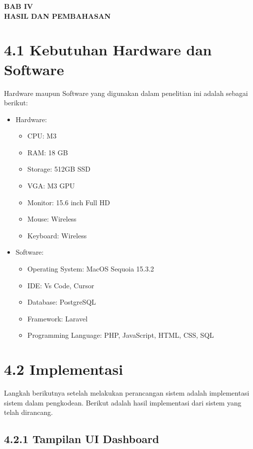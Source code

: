 \begin{center}
  \textbf{BAB IV} \\[0.5em]
  \textbf{HASIL DAN PEMBAHASAN}
\end{center}

\section*{4.1 Kebutuhan Hardware dan Software}
Hardware maupun Software yang digunakan dalam penelitian ini adalah sebagai berikut:

\begin{itemize}
  \item Hardware:
    \begin{itemize}
      \item CPU: M3
      \item RAM: 18 GB
      \item Storage: 512GB SSD
      \item VGA: M3 GPU
      \item Monitor: 15.6 inch Full HD
      \item Mouse: Wireless
      \item Keyboard: Wireless
    \end{itemize}
  \item Software:
    \begin{itemize}
      \item Operating System: MacOS Sequoia 15.3.2
      \item IDE: Vs Code, Cursor
      \item Database: PostgreSQL
      \item Framework: Laravel
      \item Programming Language: PHP, JavaScript, HTML, CSS, SQL
    \end{itemize}
\end{itemize}

\section*{4.2 Implementasi}

Langkah berikutnya setelah melakukan perancangan sistem adalah implementasi sistem dalam pengkodean. Berikut adalah hasil implementasi dari sistem yang telah dirancang.

\subsection*{4.2.1 Tampilan UI Dashboard}